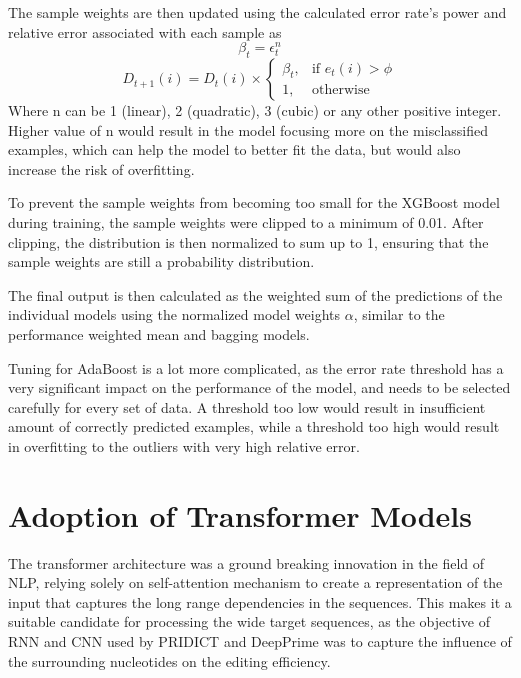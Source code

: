 The sample weights are then updated using the calculated error rate's power and relative error associated with each sample as 
$$
\beta_t = \epsilon_t ^ n
$$
$$
D_{t+1}(i) = D_t(i) \times \begin{cases}
    \beta_t, & \text{if } e_t(i) > \phi \\
    1, & \text{otherwise}
\end{cases}
$$
Where n can be 1 (linear), 2 (quadratic), 3 (cubic) or any other positive integer. Higher value of n would result in the model focusing more on the misclassified examples, which can help the model to better fit the data, but would also increase the risk of overfitting.

To prevent the sample weights from becoming too small for the XGBoost model during training, the sample weights were clipped to a minimum of 0.01. After clipping, the distribution is then normalized to sum up to 1, ensuring that the sample weights are still a probability distribution.

The final output is then calculated as the weighted sum of the predictions of the individual models using the normalized model weights $\alpha$, similar to the performance weighted mean and bagging models.

Tuning for AdaBoost is a lot more complicated, as the error rate threshold has a very significant impact on the performance of the model, and needs to be selected carefully for every set of data. A threshold too low would result in insufficient amount of correctly predicted examples, while a threshold too high would result in overfitting to the outliers with very high relative error\cite{shresthaExperimentsAdaBoostRT2006}. 



\section{Adoption of Transformer Models}

The transformer architecture was a ground breaking innovation in the field of NLP, relying solely on self-attention mechanism to create a representation of the input that captures the long range dependencies in the sequences\cite{vaswaniAttentionAllYou2017}. This makes it a suitable candidate for processing the wide target sequences, as the objective of RNN and CNN used by PRIDICT and DeepPrime was to capture the influence of the surrounding nucleotides on the editing efficiency.

